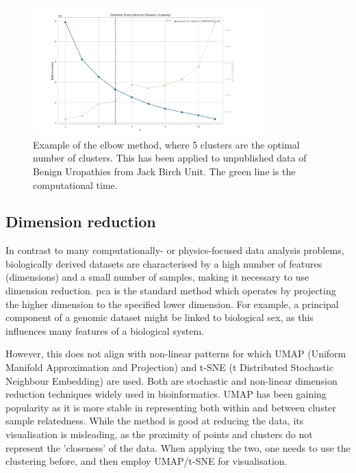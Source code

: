 \begin{figure}[!htb]
  \centering\includegraphics[width=0.8\textwidth,height=0.8\textheight,keepaspectratio]{Sections/Lit_review/Resources/elbow_method.png}
    \caption{Example of the elbow method, where 5 clusters are the optimal number of clusters. This has been applied to unpublished data of Benign Uropathies from Jack Birch Unit. The green line is the computational time. }
    \label{fig:elbow_method}
\end{figure}
\FloatBarrier

\subsection{Dimension reduction} \label{s:lit:dim_red}

In contrast to many computationally- or physics-focused data analysis problems, biologically derived datasets are characterised by a high number of features (dimensions) and a small number of samples, making it necessary to use dimension reduction. \acrfull{pca} is the standard method which operates by projecting the higher dimension to the specified lower dimension. For example, a principal component of a genomic dataset might be linked to biological sex, as this influences many features of a biological system.

However, this does not align with non-linear patterns for which UMAP (Uniform Manifold Approximation and Projection) and t-SNE (t Distributed Stochastic Neighbour Embedding) are used. Both are stochastic and non-linear dimension reduction techniques widely used in bioinformatics. UMAP has been gaining popularity as it is more stable in representing both within and between cluster sample relatedness. While the method is good at reducing the data, its visualisation is misleading, as the proximity of points and clusters do not represent the 'closeness' of the data. When applying the two, one needs to use the clustering before, and then employ UMAP/t-SNE for visualisation.

